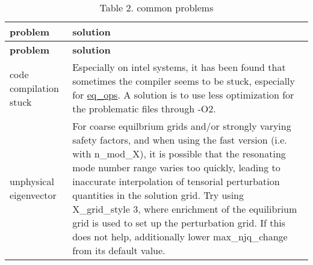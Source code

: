 \begin{longtabu} spread 0pt [c]{*{2}{|X[-1]}|}
\caption{Table 2. common problems}\label{page_faq_faq_problems_tab}\\
\hline
\rowcolor{\tableheadbgcolor}\textbf{ problem }&\textbf{ solution   }\\
\endfirsthead
\hline
\endfoot
\hline
\rowcolor{\tableheadbgcolor}\textbf{ problem }&\textbf{ solution   }\\
\endhead
code compilation stuck &Especially on intel systems, it has been found that sometimes the compiler seems to be stuck, especially for {\ttfamily \hyperlink{namespaceeq__ops}{eq\+\_\+ops}}. A solution is to use less optimization for the problematic files through {\ttfamily -\/\+O2}.   \\
unphysical eigenvector &For coarse equilbrium grids and/or strongly varying safety factors, and when using the fast version (i.\+e. with {\ttfamily n\+\_\+mod\+\_\+X}), it is possible that the resonating mode number range varies too quickly, leading to inaccurate interpolation of tensorial perturbation quantities in the solution grid. Try using {\ttfamily X\+\_\+grid\+\_\+style} 3, where enrichment of the equilibrium grid is used to set up the perturbation grid. If this does not help, additionally lower {\ttfamily max\+\_\+njq\+\_\+change} from its default value.   \\

\end{longtabu}

